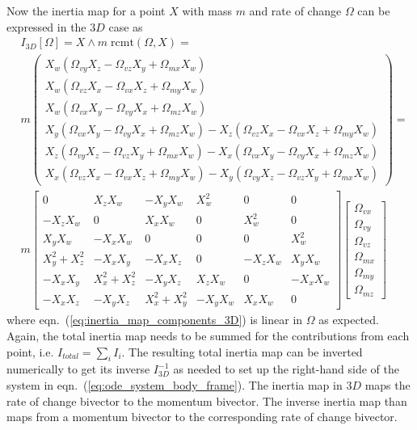 Now the inertia map for a point $X$ with mass $m$ and rate of change $\Omega$ can be
expressed in the $3D$ case as
\begin{align}
    &I_{3D}[\Omega] = X \wedge m \; \mathrm{rcmt}(\Omega,X) = \nonumber \\[10pt]
    &m 
    \begin{pmatrix}
        X_w (\Omega_{vy} X_z - \Omega_{vz} X_y + \Omega_{mx} X_w) \\
        X_w (\Omega_{vz} X_x - \Omega_{vx} X_z + \Omega_{my} X_w) \\
        X_w (\Omega_{vx} X_y - \Omega_{vy} X_x + \Omega_{mz} X_w) \\
        X_y (\Omega_{vx} X_y - \Omega_{vy} X_x + \Omega_{mz} X_w) 
      - X_z (\Omega_{vz} X_x - \Omega_{vx} X_z + \Omega_{my} X_w) \\
        X_z (\Omega_{vy} X_z - \Omega_{vz} X_y + \Omega_{mx} X_w)
      - X_x (\Omega_{vx} X_y - \Omega_{vy} X_x + \Omega_{mz} X_w) \\
        X_x (\Omega_{vz} X_x - \Omega_{vx} X_z + \Omega_{my} X_w) - X_y (\Omega_{vy} X_z -
      \Omega_{vz} X_y + \Omega_{mx} X_w) \end{pmatrix} = \nonumber \\[10pt]
    &m
    \begin{bmatrix}
      0              &  X_z X_w       & -X_y X_w       & X_w^2    &  0       &  0       \\
      -X_z X_w       &  0             &  X_x X_w       & 0        &  X_w^2   &  0       \\
       X_y X_w       & -X_x X_w       &  0             & 0        &  0       &  X_w^2   \\
       X_y^2 + X_z^2 & -X_x X_y       & -X_x X_z       & 0        & -X_z X_w &  X_y X_w \\
      -X_x X_y       &  X_x^2 + X_z^2 & -X_y X_z       &  X_z X_w &  0       & -X_x X_w \\
      -X_x X_z       & -X_y X_z       &  X_x^2 + X_y^2 & -X_y X_w &  X_x X_w &  0
    \end{bmatrix}
    \begin{bmatrix}
        \Omega_{vx} \\ \Omega_{vy} \\ \Omega_{vz} \\
        \Omega_{mx} \\ \Omega_{my} \\ \Omega_{mz}
    \end{bmatrix} 
    \label{eq:inertia_map_components_3D}   
\end{align}
where eqn.~(\ref{eq:inertia_map_components_3D}) is linear in $\Omega$ as expected. Again,
the total inertia map needs to be summed for the contributions from each point, i.e.
$I_{total} = \sum_i{I_i}$. The resulting total inertia map can be inverted numerically to
get its inverse $I_{3D}^{-1}$ as needed to set up the right-hand side of the system in
eqn.~(\ref{eq:ode_system_body_frame}). The inertia map in $3D$ maps the rate of change
bivector to the momentum bivector. The inverse inertia map than maps from a momentum
bivector to the corresponding rate of change bivector.\\

